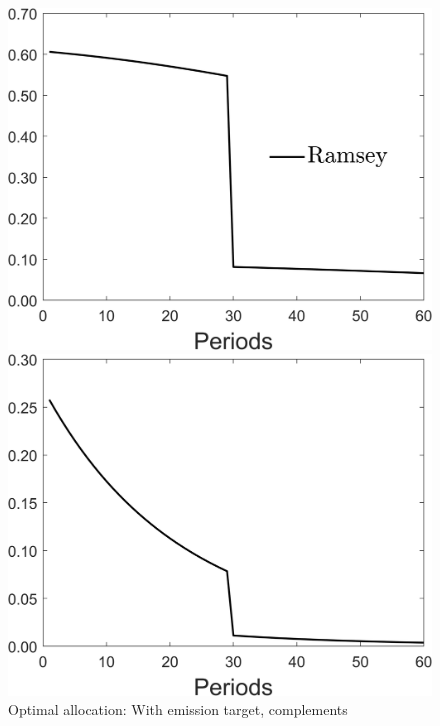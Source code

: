 \begin{figure}[h!!]
	\centering
	\caption{Optimal allocation: With emission target, complements }\label{fig:optallo_comp_onlyR_target}
	\begin{minipage}[]{0.32\textwidth}
		\includegraphics[width=1\textwidth]{../codding_model/Own/figures/Rep_agent/staticonlyRam_separate_c_periods59_eppsilon0.40_zeta1.40_Ad08_Ac04_thetac0.70_thetad0.56_HetGrowth1_tauul0.181_util0_withtarget1_lgd1.png}
	\end{minipage}
	\begin{minipage}[]{0.32\textwidth}
		\includegraphics[width=1\textwidth]{../codding_model/Own/figures/Rep_agent/staticonlyRam_separate_hh_periods59_eppsilon0.40_zeta1.40_Ad08_Ac04_thetac0.70_thetad0.56_HetGrowth1_tauul0.181_util0_withtarget1_lgd0.png}

\end{minipage}
\end{figure}
